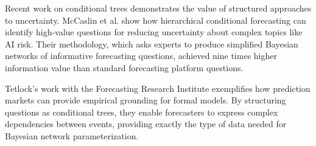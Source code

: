 \documentclass[
  11pt,
  letterpaper,
  openany]{book}
\begin{document}
Recent work on conditional trees demonstrates the value of structured
approaches to uncertainty. McCaslin et al. \textcite{mccaslin2024} show
how hierarchical conditional forecasting can identify high-value
questions for reducing uncertainty about complex topics like AI risk.
Their methodology, which asks experts to produce simplified Bayesian
networks of informative forecasting questions, achieved nine times
higher information value than standard forecasting platform questions.

Tetlock's work with the Forecasting Research Institute
\textcite{tetlock2022} exemplifies how prediction markets can provide
empirical grounding for formal models. By structuring questions as
conditional trees, they enable forecasters to express complex
dependencies between events, providing exactly the type of data needed
for Bayesian network parameterization.
\end{document}
